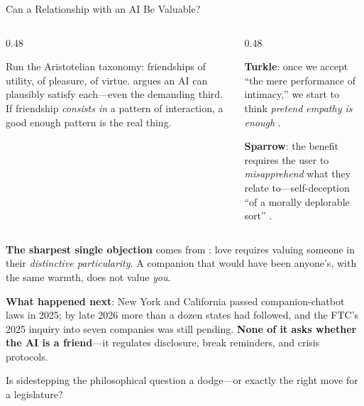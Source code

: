 \documentclass[aspectratio=169,11pt]{beamer}
\begin{document}
\begin{frame}[shrink=8]{Can a Relationship with an AI Be Valuable?}
\begin{columns}[T]
\begin{column}{0.48\textwidth}
\begin{probox}
\scriptsize
Run the Aristotelian taxonomy: friendships of utility, of pleasure, of virtue. \textcite{danaher_robot_friendship} argues an AI can plausibly satisfy each---even the demanding third. If friendship \emph{consists in} a pattern of interaction, a good enough pattern is the real thing.
\end{probox}
\end{column}
\begin{column}{0.48\textwidth}
\begin{objectionbox}
\scriptsize
\textbf{Turkle}: once we accept ``the mere performance of intimacy,'' we start to think \emph{pretend empathy is enough} \parencite{turkle_alone_together}.

\textbf{Sparrow}: the benefit requires the user to \emph{misapprehend} what they relate to---self-deception ``of a morally deplorable sort'' \parencite{sparrow_robot_dogs}.
\end{objectionbox}
\end{column}
\end{columns}

{\scriptsize \textbf{The sharpest single objection} comes from \textcite{nyholm_frank_love_robots}: love requires valuing someone in their \emph{distinctive particularity}. A companion that would have been anyone's, with the same warmth, does not value \emph{you}.}

{\small \textbf{What happened next}: New York and California passed companion-chatbot laws in 2025; by late 2026 more than a dozen states had followed, and the FTC's 2025 inquiry into seven companies was still pending. \textbf{None of it asks whether the AI is a friend}---it regulates disclosure, break reminders, and crisis protocols.}

\begin{discussionbox}[Discussion]
\small Is sidestepping the philosophical question a dodge---or exactly the right move for a legislature?
\end{discussionbox}
\end{frame}
\end{document}
